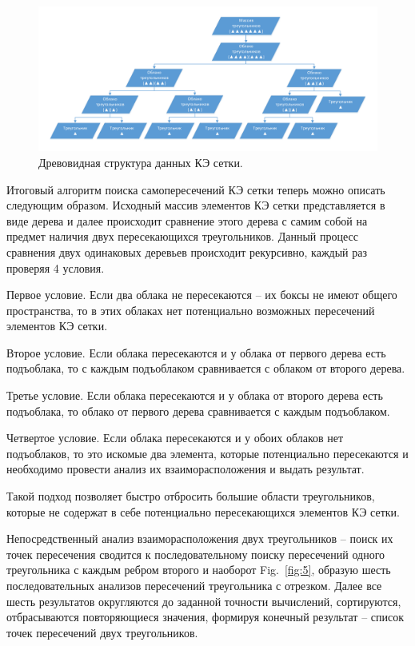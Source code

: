 \documentclass[
11pt,%
tightenlines,%
twoside,%
onecolumn,%
nofloats,%
nobibnotes,%
nofootinbib,%
superscriptaddress,%
noshowpacs,%
centertags]%
{revtex4}
\begin{document}
\begin{figure}[h]
\includegraphics[width=1.0\textwidth]{pics/pic_4.pdf}
\caption{Древовидная структура данных КЭ сетки.}\label{fig:4}
\end{figure}

Итоговый алгоритм поиска самопересечений КЭ сетки теперь можно описать следующим образом. Исходный массив элементов КЭ сетки представляется в виде дерева и далее происходит сравнение этого дерева с самим собой на предмет наличия двух пересекающихся треугольников. Данный процесс сравнения двух одинаковых деревьев происходит рекурсивно, каждый раз проверяя 4 условия.

Первое условие. Если два облака не пересекаются – их боксы не имеют общего пространства, то в этих облаках нет потенциально возможных пересечений элементов КЭ сетки.

Второе условие. Если облака пересекаются и у облака от первого дерева есть подъоблака, то с каждым подъоблаком сравнивается с облаком от второго дерева.

Третье условие. Если облака пересекаются и у облака от второго дерева есть подъоблака, то облако от первого дерева сравнивается с каждым подъоблаком.

Четвертое условие. Если облака пересекаются и у обоих облаков нет подъоблаков, то это искомые два элемента, которые потенциально пересекаются и необходимо провести анализ их взаиморасположения и выдать результат.

Такой подход позволяет быстро отбросить большие области треугольников, которые не содержат в себе потенциально пересекающихся элементов КЭ сетки.

Непосредственный анализ взаиморасположения двух треугольников – поиск их точек пересечения сводится к последовательному поиску пересечений одного треугольника с каждым ребром второго и наоборот Fig.~\ref{fig:5}, образую шесть последовательных анализов пересечений треугольника с отрезком. Далее все шесть результатов округляются до заданной точности вычислений, сортируются, отбрасываются повторяющиеся значения, формируя конечный результат – список точек пересечений двух треугольников.
\end{document}
